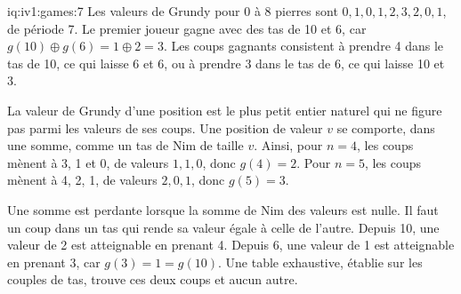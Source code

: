 \begin{solution}{iq:iv1:games:7}
Les valeurs de Grundy pour 0 à 8 pierres sont $0, 1, 0, 1, 2, 3, 2, 0, 1$, de période 7. Le premier joueur gagne avec des tas de 10 et 6, car $g(10) \oplus g(6) = 1 \oplus 2 = 3$. Les coups gagnants consistent à prendre 4 dans le tas de 10, ce qui laisse 6 et 6, ou à prendre 3 dans le tas de 6, ce qui laisse 10 et 3.

La valeur de Grundy d'une position est le plus petit entier naturel qui ne figure pas parmi les valeurs de ses coups. Une position de valeur $v$ se comporte, dans une somme, comme un tas de Nim de taille $v$. Ainsi, pour $n = 4$, les coups mènent à 3, 1 et 0, de valeurs $1, 1, 0$, donc $g(4) = 2$. Pour $n = 5$, les coups mènent à 4, 2, 1, de valeurs $2, 0, 1$, donc $g(5) = 3$.

Une somme est perdante lorsque la somme de Nim des valeurs est nulle. Il faut un coup dans un tas qui rende sa valeur égale à celle de l'autre. Depuis 10, une valeur de 2 est atteignable en prenant 4. Depuis 6, une valeur de 1 est atteignable en prenant 3, car $g(3) = 1 = g(10)$. Une table exhaustive, établie sur les couples de tas, trouve ces deux coups et aucun autre.

\end{solution}

